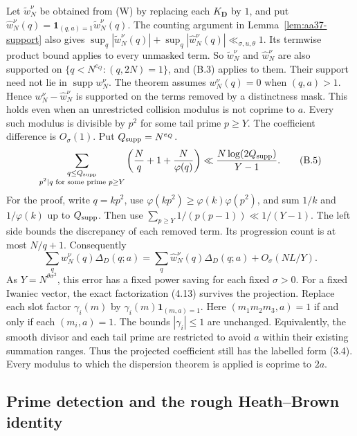 Let $\widetilde w_N^\nu$ be obtained from (W) by replacing each
$K_{\mathbf D}$ by $1$, and put
$\widehat w_N^\nu(q)=\mathbf1_{(q,a)=1}\widetilde w_N^\nu(q)$.
The counting argument in Lemma~\ref{lem:aa37-support} also gives
$\sup_q|\widetilde w_N^\nu(q)|+\sup_q|\widehat w_N^\nu(q)|
\ll_{\sigma,u,\theta}1$. Its termwise product bound applies to every
unmasked term. So $\widetilde w_N^\nu$ and $\widehat w_N^\nu$ are
also supported on $\{q<N^{e_Q}:(q,2N)=1\}$, and (B.3) applies to them.
Their support need not lie in $\operatorname{supp}w_N^\nu$.
The theorem assumes $w_N^\nu(q)=0$ when $(q,a)>1$. Hence
$w_N^\nu-\widehat w_N^\nu$ is supported on the terms removed by a
distinctness mask. This holds even when an unrestricted collision
modulus is not coprime to $a$. Every such modulus is divisible by
$p^2$ for some tail prime $p\ge Y$. The coefficient difference is
$O_\sigma(1)$. Put $Q_{\rm supp}=N^{e_Q}$.
\[
 \sum_{\substack{q\le Q_{\rm supp}\\p^2\mid q\text{ for some prime }p\ge Y}}
 \left(\frac Nq+1+\frac N{\varphi(q)}\right)
 \ll \frac{N\log(2Q_{\rm supp})}{Y-1}.
 \tag{B.5}
\]
For the proof, write $q=kp^2$, use
$\varphi(kp^2)\ge\varphi(k)\varphi(p^2)$, and sum
$1/k$ and $1/\varphi(k)$ up to $Q_{\rm supp}$. Then use
$\sum_{p\ge Y}1/(p(p-1))\ll1/(Y-1)$. The left side bounds the
discrepancy of each removed term. Its progression count is at
most $N/q+1$. Consequently
\[
 \sum_q w_N^\nu(q)\Delta_D(q;a)
 =\sum_q\widehat w_N^\nu(q)\Delta_D(q;a)
   +O_\sigma(NL/Y).
 \tag{B.6}
\]
As $Y=N^{\theta\sigma^2}$, this error has a fixed power saving for each
fixed $\sigma>0$.
For a fixed Iwaniec vector, the exact factorization (4.13) survives
the projection. Replace each slot factor $\gamma_i(m)$ by
$\gamma_i(m)\mathbf1_{(m,a)=1}$. Here
$(m_1m_2m_3,a)=1$ if and only if each $(m_i,a)=1$.
The bounds $|\gamma_i|\le1$ are unchanged. Equivalently, the smooth
divisor and each tail prime are restricted to avoid $a$ within their
existing summation ranges. Thus the projected coefficient still has
the labelled form (3.4). Every modulus to which the dispersion
theorem is applied is coprime to $2a$.

\subsection*{Prime detection and the rough Heath--Brown identity}

